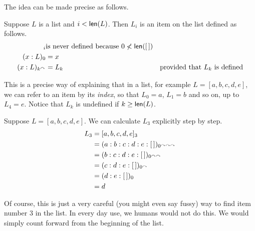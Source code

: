 The idea can be made precise as follows.

\begin{defn}\label{def:ListIndices}
Suppose $L$ is a list and $i<\mathord{\textsf{len}}(L)$. Then $L_i$ is an item on the list
defined as follows.
\begin{align*}
  [\,]_i &\text{is never defined because $0\not<\len([\,])$}\\
  (x:L)_0 &= x\\
  (x:L)_{k^\nxt} &= L_k &\text{provided that $L_k$ is defined}
\end{align*}
\end{defn}

This is a precise way of explaining that in a list, for example $L=[a,b,c,d,e]$,
we can refer to an item by its \emph{index}, so that $L_0 = a$, $L_1=b$ and so on,
up to $L_4 = e$. Notice that $L_k$ is undefined if $k\geq \mathord{\textsf{len}}(L)$.

\ipadbreak

\begin{example}
Suppose $L=[a,b,c,d,e]$. We can calculate $L_3$ 
explicitly step by step.
\begin{align*}
L_3 &= [a,b,c,d,e]_3\\
    &= (a:b:c:d:e:[\,])_{0^{\curvearrowright\curvearrowright\curvearrowright}}\\
    &= (b:c:d:e:[\,])_{0^{\curvearrowright\curvearrowright}}\\
    &= (c:d:e:[\,])_{0^\curvearrowright}\\
    &= (d:e:[\,])_0\\
    &= d
\end{align*}

Of course, this is just a very careful (you might even say fussy) way to find item number $3$ in the list. In every day use, we humans would not do this. We would simply count forward
from the beginning of the list.

\end{example}

\ipadbreak

